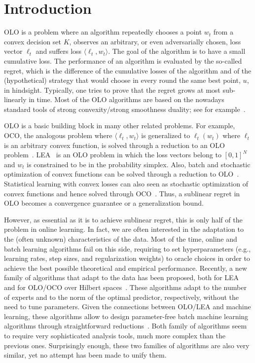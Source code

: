 \section{Introduction}
\label{section:introduction}

\ac{OLO} is a problem where an algorithm repeatedly chooses a point $w_t$ from
a convex decision set $K$, observes an arbitrary, or even adversarially chosen,
loss vector $\ell_t$ and suffers loss $\langle \ell_t, w_t \rangle$. The goal
of the algorithm is to have a small cumulative loss. The performance of an
algorithm is evaluated by the so-called regret, which is the difference of the
cumulative losses of the algorithm and of the (hypothetical) strategy that
would choose in every round the same best point, $u$, in hindsight. Typically,
one tries to prove that the regret grows at most sub-linearly in time. Most of
the \ac{OLO} algorithms are based on the nowadays standard tools of strong
convexity/strong smoothness duality; see for example~\citet{Shalev-Shwartz12}.

\ac{OLO} is a basic building block in many other related problems. For example,
\ac{OCO}, the analogous problem where $\langle \ell_t, w_t \rangle$ is
generalized to $\ell_t(w_t)$ where $\ell_t$ is an arbitrary convex function, is
solved through a reduction to an \ac{OLO}
problem~\citep{Cesa-BianchiL06,Shalev-Shwartz12}.
\ac{LEA}~\citep{LittlestoneW94,Vovk98,Cesa-BianchiFHHSW97} is an \ac{OLO}
problem in which the loss vectors belong to $[0,1]^N$ and $w_t$ is constrained
to be in the probability simplex. Also, batch and stochastic optimization of
convex functions can be solved through a reduction to
\ac{OLO}~\citep{Shalev-Shwartz12}. Statistical learning with convex losses can
also seen as stochastic optimization of convex functions and hence solved
through \ac{OCO}~\citep{Munro1951}. Thus, a sublinear regret in \ac{OLO} becomes
a convergence guarantee or a generalization bound.

However, as essential as it is to achieve sublinear regret, this is only half of
the problem in online learning. In fact, we are often interested in the
adaptation to the (often unknown) characteristics of the data. Most of the time,
online and batch learning algorithms fail on this side, requiring to set
hyperparameters (e.g., learning rates, step sizes, and regularization weights)
to oracle choices in order to achieve the best possible theoretical and
empirical performance. Recently, a new family of algorithms that adapt to the
data has been proposed, both for \ac{LEA}~\citep{ChaudhuriYH09,ChernovV10,LuoE14,LuoS15,KoolenE15}
and for \ac{OLO}/\ac{OCO} over Hilbert spaces~\citep{StreeterM12,Orabona13,McMahanA13,McMahanO14,Orabona14}.
These algorithms adapt to the number of experts and to the norm of the optimal
predictor, respectively, without the need to tune parameters. Given the connections between \ac{OLO}/\ac{LEA} and
machine learning, these algorithms allow to design parameter-free batch machine
learning algorithms through straightforward reductions~\citep{Orabona14,LuoS15}.
Both family of algorithms seem to require very sophisticated analysis tools,
much more complex than the previous ones. Surprisingly enough, these two
families of algorithms are also very similar, yet no attempt has been made to
unify them.

